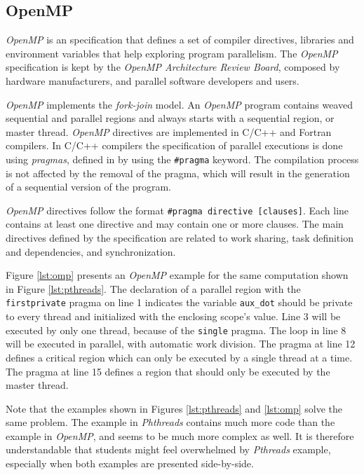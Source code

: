 \subsection{OpenMP}

\textit{OpenMP} is an specification that defines a set of compiler directives,
libraries and environment variables that help exploring program parallelism.
The \textit{OpenMP} specification is kept by the \textit{OpenMP Architecture
Review Board}, composed by hardware manufacturers, and parallel software
developers and users.

\textit{OpenMP} implements the \textit{fork-join} model. An \textit{OpenMP}
program contains weaved sequential and parallel regions and always starts with
a sequential region, or master thread.  \textit{OpenMP} directives are
implemented in C/C++ and Fortran compilers. In C/C++ compilers the
specification of parallel executions is done using \textit{pragmas}, defined in
by using the \texttt{\#pragma} keyword.
The compilation process is not affected by the removal of the pragma,
which will result in the generation of a sequential version of the program.

\textit{OpenMP} directives follow the format \texttt{\#pragma directive
[clauses]}.  Each line contains at least one directive and may contain one or
more clauses. The main directives defined by the specification are related
to work sharing, task definition and dependencies, and synchronization.

Figure \ref{lst:omp} presents an \textit{OpenMP} example for the
same computation shown in Figure \ref{lst:pthreads}. The
declaration of a parallel region with the \texttt{firstprivate} pragma on line
1 indicates the variable \texttt{aux\_dot} should be private to every thread
and initialized with the enclosing scope's value.  Line 3 will be executed by
only one thread, because of the \texttt{single} pragma.
The loop in line 8 will be executed in parallel, with automatic work
division.  The pragma at line 12 defines a critical region which can only be
executed by a single thread at a time. The pragma at line 15 defines a
region that should only be executed by the master thread.

Note that the examples shown in Figures \ref{lst:pthreads} and
\ref{lst:omp} solve the same problem. The example in \textit{Phthreads}
contains much more code than the example in \textit{OpenMP}, and seems
to be much more complex as well. It is therefore understandable that students might
feel overwhelmed by \textit{Pthreads} example, especially when both examples are
presented side-by-side.

